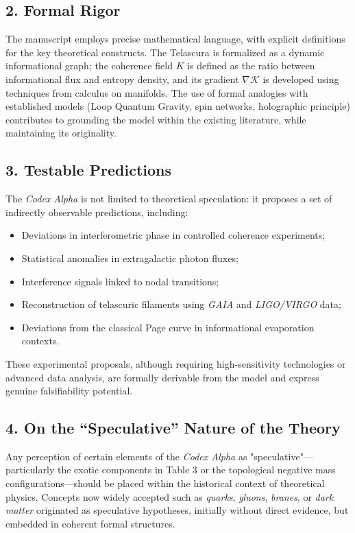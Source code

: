 \documentclass[12pt]{article}
\begin{document}
\subsection*{2. Formal Rigor}

The manuscript employs precise mathematical language, with explicit definitions for the key theoretical constructs. The Telascura is formalized as a dynamic informational graph; the coherence field $K$ is defined as the ratio between informational flux and entropy density, and its gradient $\nabla \mathcal{K}$ is developed using techniques from calculus on manifolds. The use of formal analogies with established models (Loop Quantum Gravity, spin networks, holographic principle) contributes to grounding the model within the existing literature, while maintaining its originality.

\subsection*{3. Testable Predictions}

The \textit{Codex Alpha} is not limited to theoretical speculation: it proposes a set of indirectly observable predictions, including:
\begin{itemize}
    \item Deviations in interferometric phase in controlled coherence experiments;
    \item Statistical anomalies in extragalactic photon fluxes;
    \item Interference signals linked to nodal transitions;
    \item Reconstruction of telascuric filaments using \textit{GAIA} and \textit{LIGO/VIRGO} data;
    \item Deviations from the classical Page curve in informational evaporation contexts.
\end{itemize}
These experimental proposals, although requiring high-sensitivity technologies or advanced data analysis, are formally derivable from the model and express genuine falsifiability potential.

\subsection*{4. On the “Speculative” Nature of the Theory}

Any perception of certain elements of the \textit{Codex Alpha} as "speculative"—particularly the exotic components in Table 3 or the topological negative mass configurations—should be placed within the historical context of theoretical physics. Concepts now widely accepted such as \textit{quarks}, \textit{gluons}, \textit{branes}, or \textit{dark matter} originated as speculative hypotheses, initially without direct evidence, but embedded in coherent formal structures.
\end{document}
